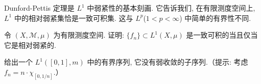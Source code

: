 \documentclass[../../main.tex]{subfiles}
\begin{document}
\begin{remark}
Dunford-Pettis 定理是 $L^{1}$ 中弱紧性的基本刻画. 它告诉我们, 在有限测度空间上, $L^{1}$ 中的相对弱紧集恰是一致可积集. 这与 $L^{p}$($1<p<\infty$) 中简单的有界性不同.
\end{remark}

\begin{exercise}\label{exercise:ch19-11}
令 $(X,\mathcal{M},\mu)$ 为有限测度空间. 证明: $\{f_{n}\}\subset L^{1}(X,\mu)$ 是一致可积的当且仅当它是相对弱紧的.
\end{exercise}

\begin{exercise}\label{exercise:ch19-12}
给出一个 $L^{1}([0,1],m)$ 中的有界序列, 它没有弱收敛的子序列.（提示: 考虑 $f_{n}=n\cdot\chi_{[0,1/n]}$.）
\end{exercise}
\end{document}
